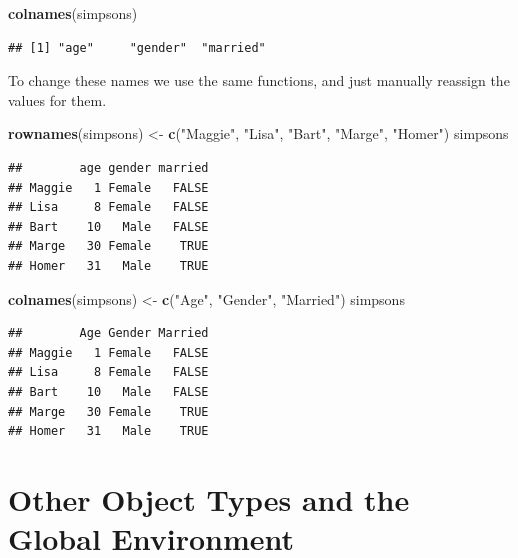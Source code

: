\documentclass[
]{book}
\newenvironment{Shaded}{\begin{snugshade}}{\end{snugshade}}
\newcommand{\KeywordTok}[1]{\textcolor[rgb]{0.13,0.29,0.53}{\textbf{#1}}}
\newcommand{\NormalTok}[1]{#1}
\newcommand{\StringTok}[1]{\textcolor[rgb]{0.31,0.60,0.02}{#1}}
\begin{document}
\begin{Shaded}
\begin{Highlighting}[]
\KeywordTok{colnames}\NormalTok{(simpsons)}
\end{Highlighting}
\end{Shaded}

\begin{verbatim}
## [1] "age"     "gender"  "married"
\end{verbatim}

To change these names we use the same functions, and just manually reassign the values for them.

\begin{Shaded}
\begin{Highlighting}[]
\KeywordTok{rownames}\NormalTok{(simpsons) <-}\StringTok{ }\KeywordTok{c}\NormalTok{(}\StringTok{"Maggie"}\NormalTok{, }\StringTok{"Lisa"}\NormalTok{, }\StringTok{"Bart"}\NormalTok{, }\StringTok{"Marge"}\NormalTok{, }\StringTok{"Homer"}\NormalTok{)}
\NormalTok{simpsons}
\end{Highlighting}
\end{Shaded}

\begin{verbatim}
##        age gender married
## Maggie   1 Female   FALSE
## Lisa     8 Female   FALSE
## Bart    10   Male   FALSE
## Marge   30 Female    TRUE
## Homer   31   Male    TRUE
\end{verbatim}

\begin{Shaded}
\begin{Highlighting}[]
\KeywordTok{colnames}\NormalTok{(simpsons) <-}\StringTok{ }\KeywordTok{c}\NormalTok{(}\StringTok{"Age"}\NormalTok{, }\StringTok{"Gender"}\NormalTok{, }\StringTok{"Married"}\NormalTok{)}
\NormalTok{simpsons}
\end{Highlighting}
\end{Shaded}

\begin{verbatim}
##        Age Gender Married
## Maggie   1 Female   FALSE
## Lisa     8 Female   FALSE
## Bart    10   Male   FALSE
## Marge   30 Female    TRUE
## Homer   31   Male    TRUE
\end{verbatim}

\hypertarget{other-object-types-and-the-global-environment}{%
\section{Other Object Types and the Global Environment}\label{other-object-types-and-the-global-environment}}
\end{document}
